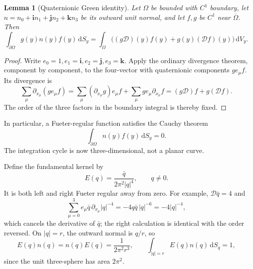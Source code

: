 \documentclass[11pt,a4paper]{article}
\numberwithin{equation}{section}
\newtheorem{lemma}[theorem]{Lemma}
\theoremstyle{definition}
\theoremstyle{remark}
\newcommand{\ii}{\mathbf i}
\newcommand{\jj}{\mathbf j}
\newcommand{\kk}{\mathbf k}
\newcommand{\cD}{\mathcal D}
\newcommand{\dd}{\,\mathrm d}
\begin{document}
\begin{lemma}[Quaternionic Green identity]\label{lem:green}
Let $\Omega$ be bounded with $C^1$ boundary, let $n=n_0+\ii n_1+\jj n_2+\kk n_3$
be its outward unit normal, and let $f,g$ be $C^1$ near $\overline\Omega$.
Then
\begin{equation}\label{eq:green}
 \int_{\partial\Omega}g(y)n(y)f(y)\dd S_y
 =\int_\Omega\bigl((g\cD)(y)f(y)+g(y)(\cD f)(y)\bigr)\dd V_y.
\end{equation}
\end{lemma}
\begin{proof}
Write $e_0=1,e_1=\ii,e_2=\jj,e_3=\kk$. Apply the ordinary divergence theorem,
component by component, to the four-vector with quaternionic components
$g e_\mu f$. Its divergence is
\[
 \sum_\mu\partial_{x_\mu}(g e_\mu f)
 =\sum_\mu(\partial_{x_\mu}g)e_\mu f
       +\sum_\mu g e_\mu\partial_{x_\mu}f
 =(g\cD)f+g(\cD f).
\]
The order of the three factors in the boundary integral is thereby fixed.
\end{proof}
In particular, a Fueter-regular function satisfies the Cauchy theorem
\begin{equation}\label{eq:fueter-cauchy-theorem}
 \int_{\partial\Omega}n(y)f(y)\dd S_y=0.
\end{equation}
The integration cycle is now three-dimensional, not a planar curve.

Define the fundamental kernel by
\begin{equation}\label{eq:fueter-kernel}
 E(q)=\frac{\bar q}{2\pi^2|q|^4},\qquad q\ne0.
\end{equation}
It is both left and right Fueter regular away from zero. For example,
$\cD\bar q=4$ and
\[
 \sum_{\mu=0}^3 e_\mu\bar q\,\partial_{x_\mu}|q|^{-4}
 =-4q\bar q\,|q|^{-6}=-4|q|^{-4},
\]
which cancels the derivative of $\bar q$; the right calculation is identical
with the order reversed. On $|q|=r$, the outward normal is $q/r$, so
\begin{equation}\label{eq:kernel-flux}
 E(q)n(q)=n(q)E(q)=\frac{1}{2\pi^2r^3},
 \qquad \int_{|q|=r}E(q)n(q)\dd S_q=1,
\end{equation}
since the unit three-sphere has area $2\pi^2$.
\end{document}
